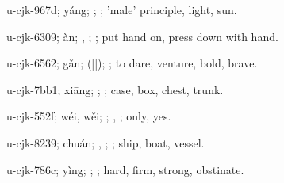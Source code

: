 \begin{multicols}{2}
{\cjkgGlue{}u-cjk-967d; yáng; \cjkgGlue{}; \cjkgGlue{}; 'male' principle, light, sun.

\cjkgGlue{}u-cjk-6309; àn; \cjkgGlue{}\cjkgGlue{}\cjkgGlue{}, \cjkgGlue{}\cjkgGlue{}\cjkgGlue{}; \cjkgGlue{}; put hand on, press down with hand.

\cjkgGlue{}u-cjk-6562; gǎn; \cjkgGlue{}\cjkgGlue{}(\cjkgGlue{}|\cjkgGlue{}|\cjkgGlue{}); \cjkgGlue{}; to dare, venture, bold, brave.

\cjkgGlue{}u-cjk-7bb1; xiāng; \cjkgGlue{}; \cjkgGlue{}; case, box, chest, trunk.

\cjkgGlue{}u-cjk-552f; wéi, wěi; \cjkgGlue{}; \cjkgGlue{}, \cjkgGlue{}; only, yes.

\cjkgGlue{}u-cjk-8239; chuán; \cjkgGlue{}, \cjkgGlue{}; \cjkgGlue{}; ship, boat, vessel.

\cjkgGlue{}u-cjk-786c; yìng; \cjkgGlue{}\cjkgGlue{}\cjkgGlue{}; \cjkgGlue{}; hard, firm, strong, obstinate.

}
\end{multicols}

